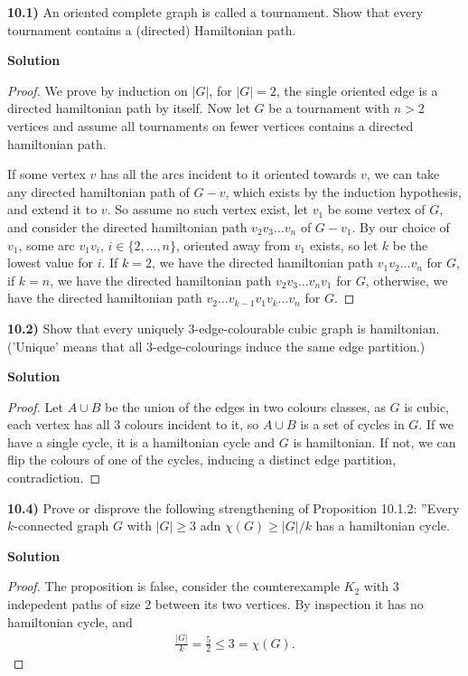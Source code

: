 \documentclass[11pt]{article}
\theoremstyle{plain}
\begin{document}
\textbf{10.1)} An oriented complete graph is called a tournament. Show that every tournament contains a (directed) Hamiltonian path.

\noindent \textbf{Solution} 

\begin{proof}
We prove by induction on $|G|$, for $|G|=2$, the single oriented edge is a directed hamiltonian path by itself. Now let $G$ be a tournament with $n>2$ vertices and assume all tournaments on fewer vertices contains a directed hamiltonian path.

If some vertex $v$ has all the arcs incident to it oriented towards $v$, we can take any directed hamiltonian path of $G-v$, which exists by the induction hypothesis, and extend it to $v$. So assume no such vertex exist, let $v_1$ be some vertex of $G$, and consider the directed hamiltonian path $v_2v_3\ldots v_n$ of $G-v_1$. By our choice of $v_1$, some arc $v_1v_i$, $i\in\{2,\ldots,n\}$, oriented away from $v_1$ exists, so let $k$ be the lowest value for $i$. If $k=2$, we have the directed hamiltonian path $v_1v_2\ldots v_n$ for $G$, if $k=n$, we have the directed hamiltonian path $v_2v_3\ldots v_nv_1$ for $G$, otherwise, we have the directed hamiltonian path $v_2\ldots v_{k-1}v_1v_k\ldots v_n$ for $G$.
\end{proof}

\textbf{10.2)} Show that every uniquely 3-edge-colourable cubic graph is hamiltonian. ('Unique' means that all 3-edge-colourings induce the same edge partition.)

\vspace{.4cm}
\noindent \textbf{Solution}

\begin{proof}
Let $A \cup B$ be the union of the edges in two colours classes, as $G$ is cubic, each vertex has all 3 colours incident to it, so $A \cup B$ is a set of cycles in $G$. If we have a single cycle, it is a hamiltonian cycle and $G$ is hamiltonian. If not, we can flip the colours of one of the cycles, inducing a distinct edge partition, contradiction.
\end{proof}


\textbf{10.4)} Prove or disprove the following strengthening of Proposition 10.1.2: ''Every $k$-connected graph $G$ with $|G| \geq 3$ adn $\chi(G) \geq |G|/k$ has a hamiltonian cycle.

\vspace{.4cm}
\noindent \textbf{Solution}

\begin{proof}
The proposition is false, consider the counterexample $K_2$ with 3 indepedent paths of size 2 between its two vertices. By inspection it has no hamiltonian cycle, and
\begin{align*}
\frac{|G|}{k} = \frac{5}{2} \leq 3 = \chi(G).
\end{align*}
\end{proof}
\end{document}
